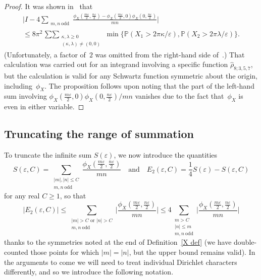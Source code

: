 \documentclass[11pt]{article}
\theoremstyle{plain}
\theoremstyle{definition}
\numberwithin{equation}{section}
\newcommand{\0}{{\vec 0}}
\begin{document}
\begin{proof} \label{use symmetry}
It was shown in~\cite[equations~(3-7) and~(3-9)]{BSRPNR} that
\begin{multline}
\biggl| I - 4 \sum_{\substack{m,n\ \text{odd}}}\frac{\phi_X(\frac{m\varepsilon}{2},\frac{n\varepsilon}{2}) - \phi_X(\frac{m\varepsilon}{2},0) \phi_X(0,\frac{n\varepsilon}{2})}{mn} \biggr| \\
\le 8\pi^2 \mathop{\sum\sum}_{\substack{\kappa,\lambda\ge0\\ 
(\kappa,\lambda)\neq(0,0)}} \min\bigl\{ \mathbb{P}(X_1>2\pi\kappa/\varepsilon), \mathbb{P}(X_2>2\pi\lambda/\varepsilon) \bigr\}.
\end{multline}
(Unfortunately, a factor of~$2$ was omitted from the right-hand side of~\cite[equation~(3-8)]{BSRPNR}.) That calculation was carried out for an integrand involving a specific function $\hat\rho_{8;3,5,7}$, but the calculation is valid for any Schwartz function symmetric about the origin, including~$\phi_X$. The proposition follows upon noting that the part of the left-hand sum involving ${\phi_X(\frac{m\varepsilon}{2},0) \phi_X(0,\frac{n\varepsilon}{2})}/{mn}$ vanishes due to the fact that~$\phi_X$ is even in either variable.
\end{proof}



\subsection{Truncating the range of summation}

To truncate the infinite sum $S(\varepsilon)$, we now introduce the quantities
\begin{equation} \label{SepsilonC prelim and E2}
S(\varepsilon,C) = \sum_{\substack{|m|,|n|\le C \\ m,n\ \text{odd}}}\frac{\phi_X(\frac{m\varepsilon}{2},\frac{n\varepsilon}{2})}{mn}
\quad\text{and}\quad
E_2(\varepsilon,C) = \frac1{4}S(\varepsilon) - S(\varepsilon,C)
\end{equation}
for any real $C\ge1$, so that
\begin{equation} \label{sneaky symmetry}
\bigl| E_2(\varepsilon,C) \bigr| \le \sum_{\substack{|m|>C \text{ or } |n|>C \\ m,n\ \text{odd}}} \biggl| \frac{\phi_X(\frac{m\varepsilon}{2},\frac{n\varepsilon}{2})}{mn} \biggr| \le 4 \sum_{\substack{m>C \\ |n| \le m \\ m,n\ \text{odd}}} \biggl| \frac{\phi_X(\frac{m\varepsilon}{2},\frac{n\varepsilon}{2})}{mn} \biggr|
\end{equation}
thanks to the symmetries noted at the end of Definition~\ref{X def} (we have double-counted those points for which $|m|=|n|$, but the upper bound remains valid).
In the arguments to come we will need to treat individual Dirichlet characters differently, and so we introduce the following notation.
\end{document}
